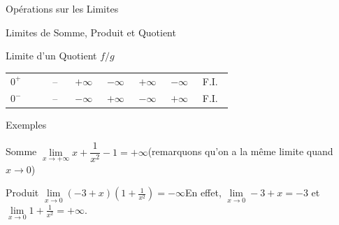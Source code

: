 \documentclass{coursbook}
\begin{document}
\begin{Gpartie}{Opérations sur les Limites}
\begin{Spartie}{Limites de Somme, Produit et Quotient}
\begin{SSpartie}{Limite d'un Quotient $f/g$}
\begin{table}[H]
\begin{tabular}{ p{0.15\linewidth} *{6}{M{0.08\linewidth}} }
                        $0^+$ & -- & $+\infty$ & $-\infty$ & $+\infty$ & $-\infty$ & F.I. \\
                        $0^-$ & -- & $-\infty$ & $+\infty$ & $-\infty$ & $+\infty$ & F.I. \\ \bottomrule
                    \end{tabular}
                \end{table}
            \end{SSpartie}
            \vfill
            \pagebreak
            \begin{SSpartie}{Exemples} 
                \begin{SSSpartie}{Somme} 
                    $\lim\limits_{x\to+\infty}x+\dfrac{1}{x^2}-1=+\infty$\quad(remarquons qu'on a la même limite quand $x\to0$)
                \end{SSSpartie}
                \begin{SSSpartie}{Produit} 
                    $\lim\limits_{x\to0}\left(-3+x\right)\left(1+\frac{1}{x^2}\right)=-\infty$\qquad En effet, $\lim\limits_{x\to0}-3+x=-3$ et $\lim\limits_{x\to0}1+\frac{1}{x^2}=+\infty$.
    

\end{SSSpartie}
\end{SSpartie}
\end{Spartie}
\end{Gpartie}
\end{document}
